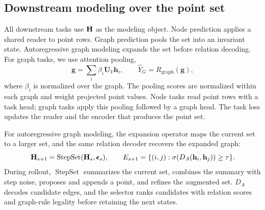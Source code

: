 \subsection{Downstream modeling over the point set}
\label{sec:interfaces}
All downstream tasks use $\mathbf{H}$ as the modeling object.  Node prediction applies
a shared reader to point rows.  Graph prediction pools the set into an invariant
state.  Autoregressive graph modeling expands the set before relation decoding.
For graph tasks, we use attention pooling,
\begin{equation}
 \mathbf g=\sum_i\beta_i\mathbf U_V\mathbf h_i,\qquad
 \widehat Y_G=R_{\mathrm{graph}}(\mathbf g),
 \label{eq:pool}
\end{equation}
where $\beta_i$ is normalized over the graph.
The pooling scores are normalized within each graph and weight projected point
values.  Node tasks read point rows with a task head; graph tasks apply this
pooling followed by a graph head.  The task loss updates the reader and the
encoder that produces the point set.

For autoregressive graph modeling, the expansion operator maps the current set to
a larger set, and the same relation decoder recovers the expanded graph:
\begin{equation}
 \mathbf{H}_{s+1}=\operatorname{StepSet}(\mathbf{H}_s,\boldsymbol\epsilon_s),
 \qquad E_{s+1}=\{(i,j):\sigma(D_A(\mathbf h_i,\mathbf h_j))\geq\tau\}.
 \label{eq:grow}
\end{equation}
During rollout, $\operatorname{StepSet}$ summarizes the current set, combines
the summary with step noise, proposes and appends a point, and refines the
augmented set.  $D_A$ decodes candidate edges, and the selector ranks candidates
with relation scores and graph-rule legality before retaining the next states.

